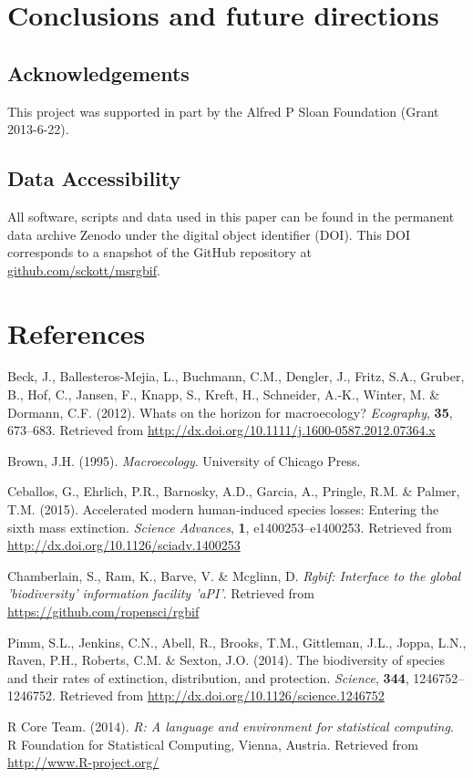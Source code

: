\documentclass[author-year, review, 11pt]{components/elsarticle} %
\begin{document}
\section{Conclusions and future
directions}\label{conclusions-and-future-directions}

\subsection{Acknowledgements}\label{acknowledgements}

This project was supported in part by the Alfred P Sloan Foundation
(Grant 2013-6-22).

\subsection{Data Accessibility}\label{data-accessibility}

All software, scripts and data used in this paper can be found in the
permanent data archive Zenodo under the digital object identifier (DOI).
This DOI corresponds to a snapshot of the GitHub repository at
\href{https://github.com/sckott/msrgbif}{github.com/sckott/msrgbif}.

\section*{References}\label{references}

Beck, J., Ballesteros-Mejia, L., Buchmann, C.M., Dengler, J., Fritz,
S.A., Gruber, B., Hof, C., Jansen, F., Knapp, S., Kreft, H., Schneider,
A.-K., Winter, M. \& Dormann, C.F. (2012). Whats on the horizon for
macroecology? \emph{Ecography}, \textbf{35}, 673--683. Retrieved from
\url{http://dx.doi.org/10.1111/j.1600-0587.2012.07364.x}

Brown, J.H. (1995). \emph{Macroecology}. University of Chicago Press.

Ceballos, G., Ehrlich, P.R., Barnosky, A.D., Garcia, A., Pringle, R.M.
\& Palmer, T.M. (2015). Accelerated modern human-induced species losses:
Entering the sixth mass extinction. \emph{Science Advances}, \textbf{1},
e1400253--e1400253. Retrieved from
\url{http://dx.doi.org/10.1126/sciadv.1400253}

Chamberlain, S., Ram, K., Barve, V. \& Mcglinn, D. \emph{Rgbif:
Interface to the global 'biodiversity' information facility 'aPI'}.
Retrieved from \url{https://github.com/ropensci/rgbif}

Pimm, S.L., Jenkins, C.N., Abell, R., Brooks, T.M., Gittleman, J.L.,
Joppa, L.N., Raven, P.H., Roberts, C.M. \& Sexton, J.O. (2014). The
biodiversity of species and their rates of extinction, distribution, and
protection. \emph{Science}, \textbf{344}, 1246752--1246752. Retrieved
from \url{http://dx.doi.org/10.1126/science.1246752}

R Core Team. (2014). \emph{R: A language and environment for statistical
computing}. R Foundation for Statistical Computing, Vienna, Austria.
Retrieved from \url{http://www.R-project.org/}
\end{document}

